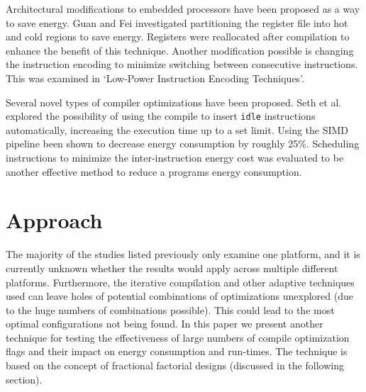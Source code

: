 \documentclass[twocolumn]{article}
\newcommand{\nsection}[1]{\section{\bfseries #1}}
\begin{document}

Architectural modifications to embedded processors have been proposed as a way to save energy. Guan and Fei investigated partitioning the register file\cite{RegisterFilePartitioning} into hot and cold regions to save energy. Registers were reallocated after compilation to enhance the benefit of this technique. Another modification possible is changing the instruction encoding to minimize switching between consecutive instructions. This was examined in `Low-Power Instruction Encoding Techniques'\cite{LowPowerInstructionEncodings}.

Several novel types of compiler optimizations have been proposed. Seth et al.\cite{Seth2001} explored the possibility of using the compile to insert \texttt{idle} instructions automatically, increasing the execution time up to a set limit. Using the SIMD pipeline been shown to decrease energy consumption\cite{Ibrahim2009} by roughly 25\%. Scheduling instructions to minimize the inter-instruction energy cost was evaluated to be another effective method to reduce a programs energy consumption\cite{Parikh}.


\nsection{Approach}

The majority of the studies listed previously only examine one platform, and it is currently unknown whether the results would apply across multiple different platforms. Furthermore, the iterative compilation and other adaptive techniques used can leave holes of potential combinations of optimizations unexplored (due to the huge numbers of combinations possible). This could lead to the most optimal configurations not being found. In this paper we present another technique for testing the effectiveness of large numbers of compile optimization flags and their impact on energy consumption and run-times. The technique is based on the concept of fractional factorial designs (discussed in the following section).
\end{document}
